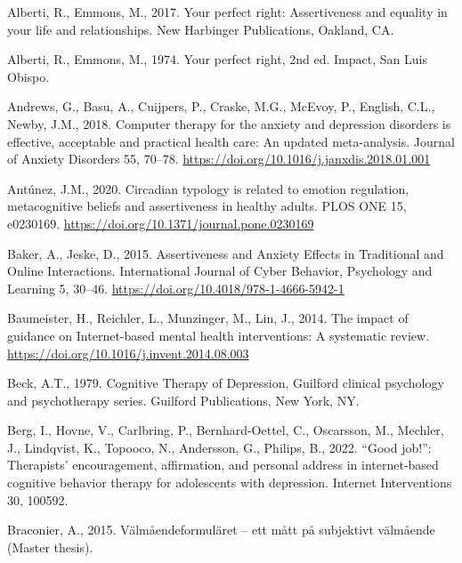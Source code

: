 \documentclass[3p]{elsarticle} %
\newlength{\cslhangindent}
\newlength{\cslentryspacingunit} %
\newenvironment{CSLReferences}[2] %
 {%
  \setlength{\parindent}{0pt}
  \ifodd #1
  \let\oldpar\par
  \def\par{\hangindent=\cslhangindent\oldpar}
  \fi
  \setlength{\parskip}{#2\cslentryspacingunit}
 }%
 {}
\begin{document}
\hypertarget{refs}{}
\begin{CSLReferences}{1}{0}
\leavevmode{}%
Alberti, R., Emmons, M., 2017. {Your perfect right: Assertiveness and
equality in your life and relationships}. New Harbinger Publications,
Oakland, CA.

\leavevmode{}%
Alberti, R., Emmons, M., 1974. {Your perfect right}, 2nd ed. Impact, San
Luis Obispo.

\leavevmode{}%
Andrews, G., Basu, A., Cuijpers, P., Craske, M.G., McEvoy, P., English,
C.L., Newby, J.M., 2018. {Computer therapy for the anxiety and
depression disorders is effective, acceptable and practical health care:
An updated meta-analysis}. Journal of Anxiety Disorders 55, 70--78.
\url{https://doi.org/10.1016/j.janxdis.2018.01.001}

\leavevmode{}%
Antúnez, J.M., 2020. Circadian typology is related to emotion
regulation, metacognitive beliefs and assertiveness in healthy adults.
PLOS ONE 15, e0230169.
\url{https://doi.org/10.1371/journal.pone.0230169}

\leavevmode{}%
Baker, A., Jeske, D., 2015. {Assertiveness and Anxiety Effects in
Traditional and Online Interactions}. International Journal of Cyber
Behavior, Psychology and Learning 5, 30--46.
\url{https://doi.org/10.4018/978-1-4666-5942-1}

\leavevmode{}%
Baumeister, H., Reichler, L., Munzinger, M., Lin, J., 2014. {The impact
of guidance on Internet-based mental health interventions: A systematic
review}. \url{https://doi.org/10.1016/j.invent.2014.08.003}

\leavevmode{}%
Beck, A.T., 1979. {Cognitive Therapy of Depression}, Guilford clinical
psychology and psychotherapy series. Guilford Publications, New York,
NY.

\leavevmode{}%
Berg, I., Hovne, V., Carlbring, P., Bernhard-Oettel, C., Oscarsson, M.,
Mechler, J., Lindqvist, K., Topooco, N., Andersson, G., Philips, B.,
2022. {``Good job!''}: Therapists' encouragement, affirmation, and
personal address in internet-based cognitive behavior therapy for
adolescents with depression. Internet Interventions 30, 100592.

\leavevmode{}%
Braconier, A., 2015. {V{ä}lm{å}endeformul{ä}ret -- ett m{å}tt p{å}
subjektivt v{ä}lm{å}ende (Master thesis)}.


\end{CSLReferences}
\end{document}
